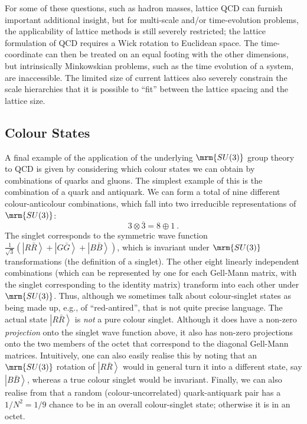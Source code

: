 For some of these questions,
such as hadron masses, lattice QCD can furnish important
additional insight, but for multi-scale and/or time-evolution
problems, the applicability of lattice methods is still severely
restricted; the lattice formulation of QCD requires 
  a Wick rotation to
  Euclidean space. The time-coordinate can then be treated on an
  equal footing with the other dimensions, but intrinsically
  Minkowskian problems, such as the time evolution of a system, are
   inaccessible. The limited size of current lattices
  also severely constrain the scale hierarchies that it is possible to
  ``fit'' between the lattice spacing and the lattice size. 

%
%
%
%

\subsection{Colour States}
%
A final example of the application of the underlying $\mrm{SU(3)}$ group
theory to QCD is given by considering which colour states we can
obtain by combinations of quarks and gluons. The simplest example of
this is the combination of a quark and antiquark. We can form a total
of nine different colour-anticolour combinations, which fall into two
irreducible representations of $\mrm{SU(3)}$:
\begin{equation}
3 \otimes \overline{3} = 8 \oplus 1~.\label{eq:33bar}
\end{equation}
The singlet corresponds to the symmetric wave function 
$\frac{1}{\sqrt{3}}\left(\left|R\bar{R}\right>+\left|G\bar{G}\right>+\left|B\bar{B}\right>\right)$, 
which is invariant under $\mrm{SU(3)}$ transformations (the definition of a
singlet). The other eight linearly independent 
combinations (which can be represented by one for each Gell-Mann
matrix, with the singlet corresponding to the identity matrix) transform
into each other under $\mrm{SU(3)}$. Thus, although we sometimes talk about
colour-singlet states as 
being made up, e.g., of ``red-antired'', that is not quite precise
language. The actual state $\left|R\bar{R}\right>$ is \emph{not} a
pure colour singlet.  Although it does
have a non-zero \emph{projection} onto the singlet wave function
above, it also has non-zero projections onto the two members of
the octet that correspond to the diagonal Gell-Mann
matrices. Intuitively, one can also easily realise this by noting that
an $\mrm{SU(3)}$ rotation of $\left|R\bar{R}\right>$ would in general turn it into a
different state, say $\left|B\bar{B}\right>$, whereas a true colour singlet
would be invariant. 
Finally, we can also realise from  that a random
(colour-uncorrelated) quark-antiquark pair has a $1/N^2=1/9$ 
chance to be in an overall colour-singlet state; otherwise it is in
an octet. 

